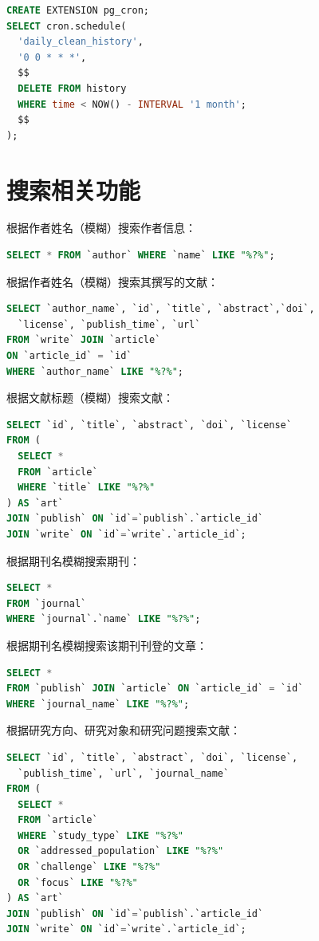 \documentclass[UTF8,openany]{ctexbook}
\begin{document}
\begin{lstlisting}[language=sql]
CREATE EXTENSION pg_cron;
SELECT cron.schedule(
  'daily_clean_history',  
  '0 0 * * *',
  $$
  DELETE FROM history
  WHERE time < NOW() - INTERVAL '1 month';
  $$
);
\end{lstlisting}


\section{搜索相关功能}

根据作者姓名（模糊）搜索作者信息：

\begin{lstlisting}[language=sql]
SELECT * FROM `author` WHERE `name` LIKE "%?%";
\end{lstlisting}

根据作者姓名（模糊）搜索其撰写的文献：

\begin{lstlisting}[language=sql]
SELECT `author_name`, `id`, `title`, `abstract`,`doi`,
  `license`, `publish_time`, `url` 
FROM `write` JOIN `article` 
ON `article_id` = `id` 
WHERE `author_name` LIKE "%?%";
\end{lstlisting}

根据文献标题（模糊）搜索文献：

\begin{lstlisting}[language=sql]
SELECT `id`, `title`, `abstract`, `doi`, `license`
FROM (
  SELECT * 
  FROM `article`
  WHERE `title` LIKE "%?%"
) AS `art`
JOIN `publish` ON `id`=`publish`.`article_id`
JOIN `write` ON `id`=`write`.`article_id`;
\end{lstlisting}

根据期刊名模糊搜索期刊：

\begin{lstlisting}[language=sql]
SELECT * 
FROM `journal` 
WHERE `journal`.`name` LIKE "%?%";
\end{lstlisting}

根据期刊名模糊搜索该期刊刊登的文章：
\begin{lstlisting}[language=sql]
SELECT * 
FROM `publish` JOIN `article` ON `article_id` = `id`
WHERE `journal_name` LIKE "%?%";
\end{lstlisting}

根据研究方向、研究对象和研究问题搜索文献：
\begin{lstlisting}[language=sql]
SELECT `id`, `title`, `abstract`, `doi`, `license`, 
  `publish_time`, `url`, `journal_name`
FROM (
  SELECT * 
  FROM `article`
  WHERE `study_type` LIKE "%?%"
  OR `addressed_population` LIKE "%?%"
  OR `challenge` LIKE "%?%"
  OR `focus` LIKE "%?%"
) AS `art`
JOIN `publish` ON `id`=`publish`.`article_id`
JOIN `write` ON `id`=`write`.`article_id`;
\end{lstlisting}
\end{document}
